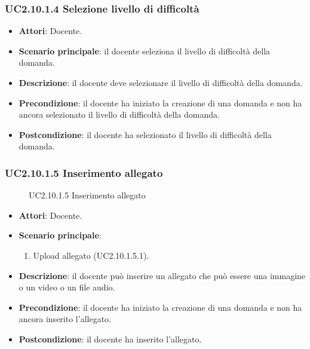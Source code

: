 \subsubsection{UC2.10.1.4 Selezione livello di difficoltà}
\begin{itemize}
\item \textbf{Attori}: Docente.
\item \textbf{Scenario principale}: il docente seleziona il livello di difficoltà della domanda.
\item \textbf{Descrizione}: il docente deve selezionare il livello di difficoltà della domanda.
\item \textbf{Precondizione}: il docente ha iniziato la creazione di una domanda e non ha ancora selezionato il livello di difficoltà della domanda.
\item \textbf{Postcondizione}: il docente ha selezionato il livello di difficoltà della domanda.
\end{itemize}
\subsubsection{UC2.10.1.5 Inserimento allegato}
\begin{figure}[H]
\centering
\noindent{}
\caption{UC2.10.1.5 Inserimento allegato}
\end{figure}
\begin{itemize}
\item \textbf{Attori}: Docente.
\item \textbf{Scenario principale}:
\begin{enumerate}
\item Upload allegato (UC2.10.1.5.1).
\end{enumerate}
\item \textbf{Descrizione}: il docente può inserire un allegato che può essere una immagine o un video o un file audio.
\item \textbf{Precondizione}: il docente ha iniziato la creazione di una domanda e non ha ancora inserito l'allegato.
\item \textbf{Postcondizione}: il docente ha inserito l'allegato.
\end{itemize}
